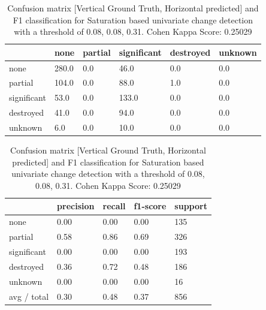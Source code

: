 \begin{table} [H]
	\footnotesize
	\captionsetup{justification=raggedright,singlelinecheck=false}
	\caption{Confusion matrix [Vertical Ground Truth, Horizontal predicted] and F1 classification for Saturation based univariate change detection with a threshold of 0.08, 0.08, 0.31. Cohen Kappa Score: 0.25029}
	\begin{tabular}{l|lllll}
            & none  & partial & significant & destroyed & unknown \\\hline
none        & 280.0 & 0.0     & 46.0        & 0.0       & 0.0     \\
partial     & 104.0 & 0.0     & 88.0        & 1.0       & 0.0     \\
significant & 53.0  & 0.0     & 133.0       & 0.0       & 0.0     \\
destroyed   & 41.0  & 0.0     & 94.0        & 0.0       & 0.0     \\
unknown     & 6.0   & 0.0     & 10.0        & 0.0       & 0.0   
	\end{tabular}
	\begin{tabular}{l|llll}
            & precision & recall & f1-score & support \\\hline
none        & 0.00      & 0.00   & 0.00     & 135     \\
partial     & 0.58      & 0.86   & 0.69     & 326     \\
significant & 0.00      & 0.00   & 0.00     & 193     \\
destroyed   & 0.36      & 0.72   & 0.48     & 186     \\
unknown     & 0.00      & 0.00   & 0.00     & 16      \\
avg / total & 0.30      & 0.48   & 0.37     & 856     
	\end{tabular}
	
	\label{tab:matS2}
\end{table}

